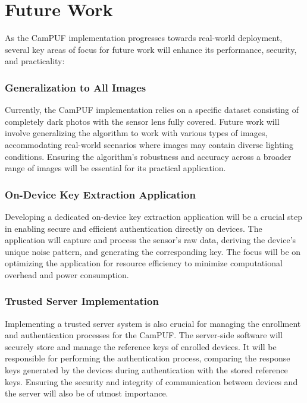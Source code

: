 \section{Future Work}
\label{sec:future_work}

As the CamPUF implementation progresses towards real-world deployment, several key areas of focus for future work will enhance its performance, security, and practicality:

\subsubsection{Generalization to All Images}

Currently, the CamPUF implementation relies on a specific dataset consisting of completely dark photos with the sensor lens fully covered. Future work will involve generalizing the algorithm to work with various types of images, accommodating real-world scenarios where images may contain diverse lighting conditions. Ensuring the algorithm's robustness and accuracy across a broader range of images will be essential for its practical application.

\subsubsection{On-Device Key Extraction Application}

Developing a dedicated on-device key extraction application will be a crucial step in enabling secure and efficient authentication directly on devices. The application will capture and process the sensor's raw data, deriving the device's unique noise pattern, and generating the corresponding key. The focus will be on optimizing the application for resource efficiency to minimize computational overhead and power consumption.

\subsubsection{Trusted Server Implementation}

Implementing a trusted server system is also crucial for managing the enrollment and authentication processes for the CamPUF. The server-side software will securely store and manage the reference keys of enrolled devices. It will be responsible for performing the authentication process, comparing the response keys generated by the devices during authentication with the stored reference keys. Ensuring the security and integrity of communication between devices and the server will also be of utmost importance.

